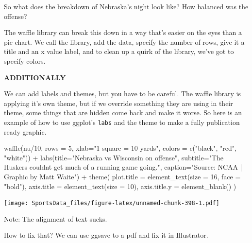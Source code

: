 \documentclass[
]{book}
\newenvironment{Shaded}{\begin{snugshade}}{\end{snugshade}}
\newcommand{\AttributeTok}[1]{\textcolor[rgb]{0.77,0.63,0.00}{#1}}
\newcommand{\DecValTok}[1]{\textcolor[rgb]{0.00,0.00,0.81}{#1}}
\newcommand{\FunctionTok}[1]{\textcolor[rgb]{0.00,0.00,0.00}{#1}}
\newcommand{\NormalTok}[1]{#1}
\newcommand{\SpecialCharTok}[1]{\textcolor[rgb]{0.00,0.00,0.00}{#1}}
\newcommand{\StringTok}[1]{\textcolor[rgb]{0.31,0.60,0.02}{#1}}
\begin{document}
So what does the breakdown of Nebraska's night look like? How balanced was the offense?

The waffle library can break this down in a way that's easier on the eyes than a pie chart. We call the library, add the data, specify the number of rows, give it a title and an x value label, and to clean up a quirk of the library, we've got to specify colors.

\textbf{ADDITIONALLY}

We can add labels and themes, but you have to be careful. The waffle library is applying it's own theme, but if we override something they are using in their theme, some things that are hidden come back and make it worse. So here is an example of how to use ggplot's \texttt{labs} and the theme to make a fully publication ready graphic.

\begin{Shaded}
\begin{Highlighting}[]
\FunctionTok{waffle}\NormalTok{(nu}\SpecialCharTok{/}\DecValTok{10}\NormalTok{, }\AttributeTok{rows =} \DecValTok{5}\NormalTok{, }\AttributeTok{xlab=}\StringTok{"1 square = 10 yards"}\NormalTok{, }\AttributeTok{colors =} \FunctionTok{c}\NormalTok{(}\StringTok{"black"}\NormalTok{, }\StringTok{"red"}\NormalTok{, }\StringTok{"white"}\NormalTok{)) }\SpecialCharTok{+} \FunctionTok{labs}\NormalTok{(}\AttributeTok{title=}\StringTok{"Nebraska vs Wisconsin on offense"}\NormalTok{, }\AttributeTok{subtitle=}\StringTok{"The Huskers couldn\textquotesingle{}t get much of a running game going."}\NormalTok{, }\AttributeTok{caption=}\StringTok{"Source: NCAA | Graphic by Matt Waite"}\NormalTok{) }\SpecialCharTok{+} 
  \FunctionTok{theme}\NormalTok{(}
    \AttributeTok{plot.title =} \FunctionTok{element\_text}\NormalTok{(}\AttributeTok{size =} \DecValTok{16}\NormalTok{, }\AttributeTok{face =} \StringTok{"bold"}\NormalTok{),}
    \AttributeTok{axis.title =} \FunctionTok{element\_text}\NormalTok{(}\AttributeTok{size =} \DecValTok{10}\NormalTok{),}
    \AttributeTok{axis.title.y =} \FunctionTok{element\_blank}\NormalTok{()}
\NormalTok{  )}
\end{Highlighting}
\end{Shaded}

\texttt{[image: SportsData\_files/figure-latex/unnamed-chunk-398-1.pdf]}

Note: The alignment of text sucks.

How to fix that? We can use ggsave to a pdf and fix it in Illustrator.
\end{document}
